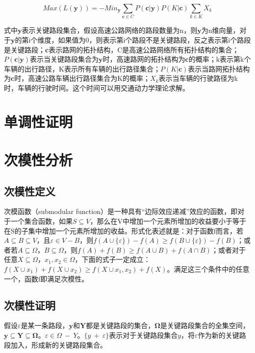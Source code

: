 		\begin{equation}
		Max(L(\bm{y})) = -Mi{n_{\bm{y} }}\sum\limits_{\bm{c} \in C} {P(\bm{c}|\bm{y} )} P(K|\bm{c})\sum\limits_{k \in K} {{X_k}} 
		\label{eq3}
		\end{equation}

		式中$\bm{y} $表示关键路段集合，假设高速公路网络的路段数量为n，则$\bm{y} $为n维向量，对于$\bm{y} $的第i个维度，如果值为0，则表示第i个路段不是关键路段，反之表示第i个路段是关键路段；$\bm{c}$表示路网的拓扑结构，C是高速公路网络所有拓扑结构的集合；${P(\bm{c}|\bm{y} )}$表示当关键路段集合为$\bm{y} $时，高速路网的拓扑结构为$\bm{c}$的概率；k表示第k个车辆的出行路径，K表示所有车辆的出行路径集合；$P(K|\bm{c})$表示当路网拓扑结构为$\bm{c}$时，高速公路车辆出行路径集合为K的概率；${{X_k}}$表示当车辆的行驶路径为k时，车辆的行驶时间。这个时间可以用交通动力学理论求解\parencite{Chen2012Identifying}。

		\section{单调性证明}
			

		\section{次模性分析}
			\subsection{次模性定义}
			次模函数（submodular function）是一种具有“边际效应递减”效应的函数，即对于一个集合函数，如果$S \subseteq V$，那么在V中增加一个元素所增加的收益要小于等于在S的子集中增加一个元素所增加的收益。形式化表述就是：对于函数f而言，若$A \subseteq B \subseteq V$，且$\varepsilon  \in V - B$，则$f(A \cup \{ \varepsilon \} ) - f(A) \ge f(B \cup \{ \varepsilon \} ) - f(B)$；或者若$A \subseteq \Omega，B \subseteq \Omega$，则$f(A) + f(B) \ge f(A\mathop  \cup \nolimits B) + f(A\mathop  \cap \nolimits B)$；或者对于任意$X \subseteq \Omega，x_1,x_2 \in \Omega$，下面的式子一定成立：$f(X \cup {x_1}) + f(X \cup {x_2}) \ge f(X \cup {x_1},{x_2}) + f(X)$。满足这三个条件中的任意一个，函数f即满足次模性。

			\subsection{次模性证明}
				假设$\varepsilon$是某一条路段，$\bm{y}$和$\bm{Y}$都是关键路段的集合，$\bm{\Omega}$是关键路段集合的全集空间，$\bm{y} \subseteq \bm{Y} \subseteq \bm{\Omega}$。$\varepsilon \in \Omega \ - \ Y$。$\{y \ + \ \varepsilon\}$表示对于关键路段集合$y$，将$\varepsilon$作为新的关键路段加入，形成新的关键路段集合。

